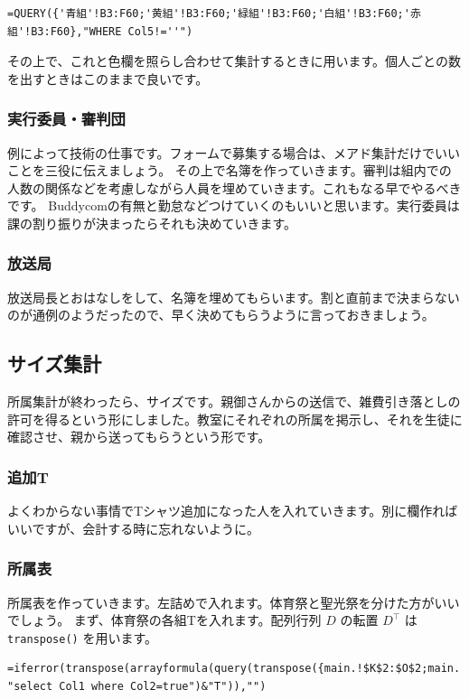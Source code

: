 \documentclass[dvipdfmx,jb5]{jreport}
\begin{document}
\begin{lstlisting}
=QUERY({'青組'!B3:F60;'黄組'!B3:F60;'緑組'!B3:F60;'白組'!B3:F60;'赤組'!B3:F60},"WHERE Col5!=''")
\end{lstlisting}

その上で、これと色欄を照らし合わせて集計するときに用います。個人ごとの数を出すときはこのままで良いです。

\subsubsection{実行委員・審判団}
例によって技術の仕事です。フォームで募集する場合は、メアド集計だけでいいことを三役に伝えましょう。
その上で名簿を作っていきます。審判は組内での人数の関係などを考慮しながら人員を埋めていきます。これもなる早でやるべきです。
Buddycomの有無と勤怠などつけていくのもいいと思います。実行委員は課の割り振りが決まったらそれも決めていきます。

\subsubsection{放送局}
放送局長とおはなしをして、名簿を埋めてもらいます。割と直前まで決まらないのが通例のようだったので、早く決めてもらうように言っておきましょう。

\subsection{サイズ集計}
所属集計が終わったら、サイズです。親御さんからの送信で、雑費引き落としの許可を得るという形にしました。教室にそれぞれの所属を掲示し、それを生徒に確認させ、親から送ってもらうという形です。

\subsubsection{追加T}
よくわからない事情でTシャツ追加になった人を入れていきます。別に欄作ればいいですが、会計する時に忘れないように。

\subsubsection{所属表}
所属表を作っていきます。左詰めで入れます。体育祭と聖光祭を分けた方がいいでしょう。
まず、体育祭の各組Tを入れます。配列行列 $D$ の転置 $D^\top$ は \texttt{transpose()} を用います。

\begin{lstlisting}
=iferror(transpose(arrayformula(query(transpose({main.!$K$2:$O$2;main.!$K3:$O3}), "select Col1 where Col2=true")&"T")),"")
\end{lstlisting}
\end{document}

